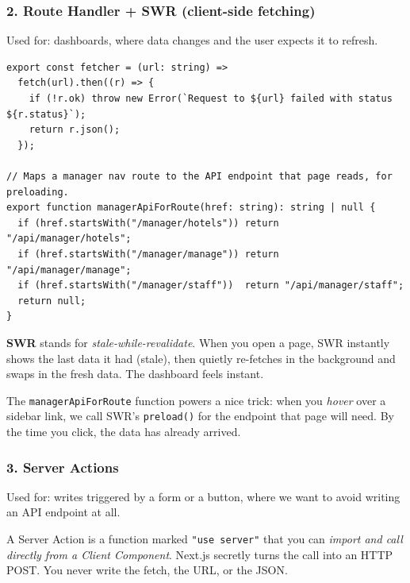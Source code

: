 \documentclass[11pt,a4paper]{article}
\begin{document}
\subsubsection{2. Route Handler + SWR (client-side fetching)}

Used for: dashboards, where data changes and the user expects it to refresh.

\begin{lstlisting}[language=TS,caption={lib/swr.ts --- one shared fetcher so preloading and fetching use the same cache key}]
export const fetcher = (url: string) =>
  fetch(url).then((r) => {
    if (!r.ok) throw new Error(`Request to ${url} failed with status ${r.status}`);
    return r.json();
  });

// Maps a manager nav route to the API endpoint that page reads, for preloading.
export function managerApiForRoute(href: string): string | null {
  if (href.startsWith("/manager/hotels")) return "/api/manager/hotels";
  if (href.startsWith("/manager/manage")) return "/api/manager/manage";
  if (href.startsWith("/manager/staff"))  return "/api/manager/staff";
  return null;
}
\end{lstlisting}

\textbf{SWR} stands for \emph{stale-while-revalidate}. When you open a page, SWR
instantly shows the last data it had (stale), then quietly re-fetches in the
background and swaps in the fresh data. The dashboard feels instant.

The \texttt{managerApiForRoute} function powers a nice trick: when you
\emph{hover} over a sidebar link, we call SWR's \texttt{preload()} for the
endpoint that page will need. By the time you click, the data has already
arrived.

\subsubsection{3. Server Actions}

Used for: writes triggered by a form or a button, where we want to avoid writing
an API endpoint at all.

A Server Action is a function marked \texttt{"use server"} that you can
\emph{import and call directly from a Client Component}. Next.js secretly turns
the call into an HTTP POST. You never write the fetch, the URL, or the JSON.
\end{document}
